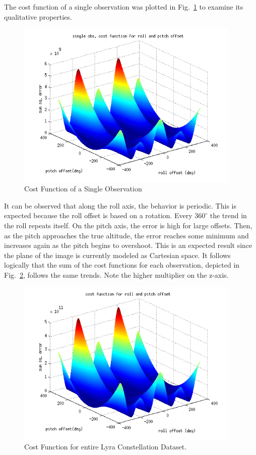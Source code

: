 \documentclass[12pt,a4paper]{book}
\begin{document}
The cost function of a single observation was plotted in Fig.~\ref{f:singleCost} to examine its qualitative properties.  
\begin{figure}[!ht]
\centering
\includegraphics[height=8cm]{singleCost.png}
\caption{Cost Function of a Single Observation}\label{f:singleCost}
\end{figure}
It can be observed that along the roll axis, the behavior is periodic.  This is expected because the roll offset is based on a rotation.  Every $360^{\circ}$ the trend in the roll repeats itself.  On the pitch axis, the error is high for large offsets. Then, as the pitch approaches the true altitude, the error reaches some minimum and increases again as the pitch begins to overshoot.  This is an expected result since the plane of the image is currently modeled as Cartesian space.  It follows logically that the sum of the cost functions for each observation, depicted in Fig.~\ref{f:sumCost}, follows the same trends.   Note the higher multiplier on the z-axis.
\begin{figure}[!ht]
\centering
\includegraphics[height=8cm]{sumCost.png}
\caption{Cost Function for entire Lyra Constellation Dataset.}\label{f:sumCost}
\end{figure}
\end{document}
